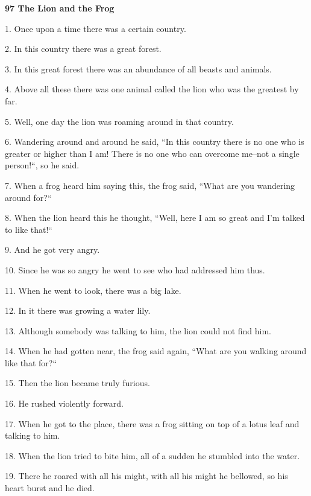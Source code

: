 
{\Large{}\textbf{97 The Lion and the Frog}}

{\Large{}1. Once upon a time there was a certain country. }

{\Large{}2. In this country there was a great forest. }

{\Large{}3. In this great forest there was an abundance of all beasts and animals.
}

{\Large{}4. Above all these there was one animal called the lion who was the greatest
by far. }

{\Large{}5. Well, one day the lion was roaming around in that country. }

{\Large{}6. Wandering around and around he said, ``In this country there
is no one who is greater or higher than I am! There is no one who can overcome
me--not a single person!``, so he said. }

{\Large{}7. When a frog heard him saying this, the frog said, ``What are
you wandering around for?``}

{\Large{}8. When the lion heard this he thought, ``Well, here I am so great
and I'm talked to like that!`` }

{\Large{}9. And he got very angry. }

{\Large{}10. Since he was so angry he went to see who had addressed him thus. }

{\Large{}11. When he went to look, there was a big lake. }

{\Large{}12. In it there was growing a water lily. }

{\Large{}13. Although somebody was talking to him, the lion could not find him.
}

{\Large{}14. When he had gotten near, the frog said again, ``What are you
walking around like that for?``}

{\Large{}15. Then the lion became truly furious. }

{\Large{}16. He rushed violently forward. }

{\Large{}17. When he got to the place, there was a frog sitting on top of a lotus
leaf and talking to him. }

{\Large{}18. When the lion tried to bite him, all of a sudden he stumbled into
the water. }

{\Large{}19. There he roared with all his might, with all his might he bellowed,
so his heart burst and he died. }


